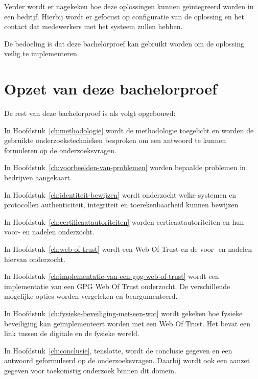 Verder wordt er nagekeken hoe deze oplossingen kunnen geïntegreerd worden in een
bedrijf. Hierbij wordt er gefocust op configuratie van de oplossing en het
contact dat medewerkers met het systeem zullen hebben.

De bedoeling is dat deze bachelorproef kan gebruikt worden om de oplossing
veilig te implementeren.

\section{Opzet van deze bachelorproef}
\label{sec:opzet-bachelorproef}


De rest van deze bachelorproef is als volgt opgebouwd:

In Hoofdstuk~\ref{ch:methodologie} wordt de methodologie toegelicht en worden de
gebruikte onderzoekstechnieken besproken om een antwoord te kunnen formuleren op
de onderzoeksvragen.

In Hoofdstuk~\ref{ch:voorbeelden-van-problemen} worden bepaalde problemen in
bedrijven aangekaart.

In Hoofdstuk~\ref{ch:identiteit-bewijzen} wordt onderzocht welke systemen en
protocollen \gls{authenticiteit}, \gls{integriteit} en \gls{toerekenbaarheid}
kunnen bewijzen

In Hoofdstuk~\ref{ch:certificaatautoriteiten} worden certicaatautoriteiten en
hun
voor- en nadelen onderzocht.

In Hoofdstuk~\ref{ch:web-of-trust} wordt een Web Of Trust en de voor- en
nadelen hiervan onderzocht.

In Hoofdstuk~\ref{ch:implementatie-van-een-gpg-web-of-trust} wordt een
implementatie van een \gls{GPG} Web Of Trust onderzocht. De verschillende mogelijke
opties worden vergeleken en beargumenteerd.

In Hoofdstuk~\ref{ch:fysieke-beveiliging-met-een-wot} wordt gekeken hoe fysieke
beveiliging kan geïmplementeert worden met een Web Of Trust. Het bevat een link
tussen de digitale en de fysieke wereld.

In Hoofdstuk~\ref{ch:conclusie}, tenslotte, wordt de conclusie gegeven en een
antwoord geformuleerd op de onderzoeksvragen. Daarbij wordt ook een aanzet
gegeven voor toekomstig onderzoek binnen dit domein.
